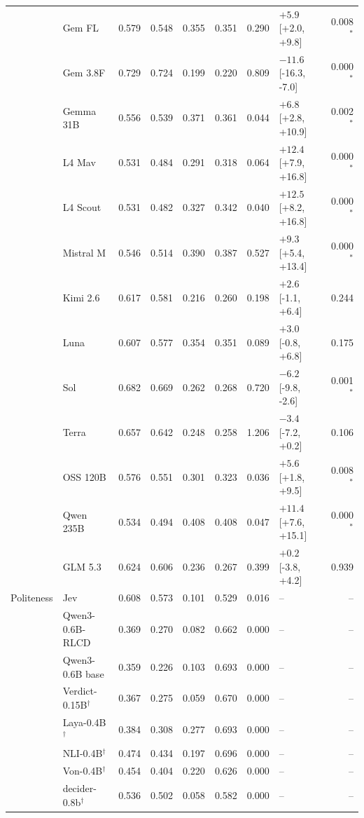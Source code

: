 \begin{longtable}{llrrrrrlr}
 & Gem FL & 0.579 & 0.548 & 0.355 & 0.351 & 0.290 & $+5.9$ [+2.0, +9.8] & 0.008$^{*}$ \\
 & Gem 3.8F & 0.729 & 0.724 & 0.199 & 0.220 & 0.809 & $-11.6$ [-16.3, -7.0] & 0.000$^{*}$ \\
 & Gemma 31B & 0.556 & 0.539 & 0.371 & 0.361 & 0.044 & $+6.8$ [+2.8, +10.9] & 0.002$^{*}$ \\
 & L4 Mav & 0.531 & 0.484 & 0.291 & 0.318 & 0.064 & $+12.4$ [+7.9, +16.8] & 0.000$^{*}$ \\
 & L4 Scout & 0.531 & 0.482 & 0.327 & 0.342 & 0.040 & $+12.5$ [+8.2, +16.8] & 0.000$^{*}$ \\
 & Mistral M & 0.546 & 0.514 & 0.390 & 0.387 & 0.527 & $+9.3$ [+5.4, +13.4] & 0.000$^{*}$ \\
 & Kimi 2.6 & 0.617 & 0.581 & 0.216 & 0.260 & 0.198 & $+2.6$ [-1.1, +6.4] & 0.244 \\
 & Luna & 0.607 & 0.577 & 0.354 & 0.351 & 0.089 & $+3.0$ [-0.8, +6.8] & 0.175 \\
 & Sol & 0.682 & 0.669 & 0.262 & 0.268 & 0.720 & $-6.2$ [-9.8, -2.6] & 0.001$^{*}$ \\
 & Terra & 0.657 & 0.642 & 0.248 & 0.258 & 1.206 & $-3.4$ [-7.2, +0.2] & 0.106 \\
 & OSS 120B & 0.576 & 0.551 & 0.301 & 0.323 & 0.036 & $+5.6$ [+1.8, +9.5] & 0.008$^{*}$ \\
 & Qwen 235B & 0.534 & 0.494 & 0.408 & 0.408 & 0.047 & $+11.4$ [+7.6, +15.1] & 0.000$^{*}$ \\
 & GLM 5.3 & 0.624 & 0.606 & 0.236 & 0.267 & 0.399 & $+0.2$ [-3.8, +4.2] & 0.939 \\
\midrule
Politeness & Jev & 0.608 & 0.573 & 0.101 & 0.529 & 0.016 & -- & -- \\
 & Qwen3-0.6B-RLCD & 0.369 & 0.270 & 0.082 & 0.662 & 0.000 & -- & -- \\
 & Qwen3-0.6B base & 0.359 & 0.226 & 0.103 & 0.693 & 0.000 & -- & -- \\
 & Verdict-0.15B$^{\dagger}$ & 0.367 & 0.275 & 0.059 & 0.670 & 0.000 & -- & -- \\
 & Laya-0.4B$^{\dagger}$ & 0.384 & 0.308 & 0.277 & 0.693 & 0.000 & -- & -- \\
 & NLI-0.4B$^{\dagger}$ & 0.474 & 0.434 & 0.197 & 0.696 & 0.000 & -- & -- \\
 & Von-0.4B$^{\dagger}$ & 0.454 & 0.404 & 0.220 & 0.626 & 0.000 & -- & -- \\
 & decider-0.8b$^{\dagger}$ & 0.536 & 0.502 & 0.058 & 0.582 & 0.000 & -- & -- \\

\end{longtable}
